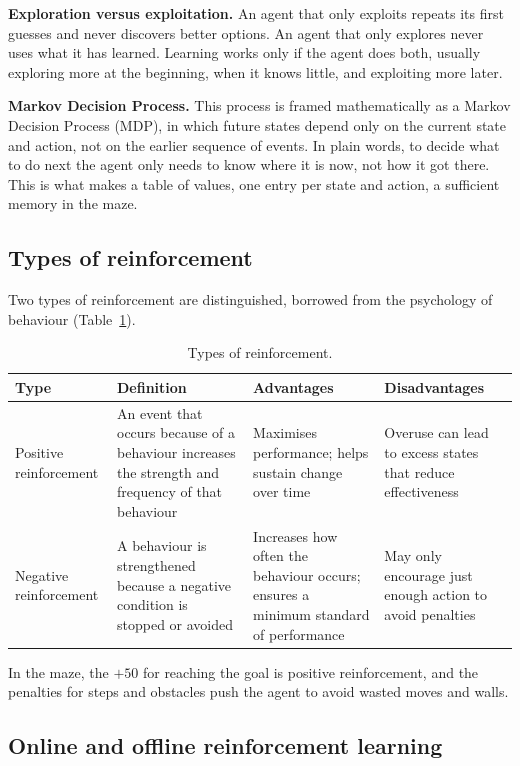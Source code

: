 \documentclass[11pt, a4paper]{article}
\begin{document}
\textbf{Exploration versus exploitation.} An agent that only exploits repeats its first guesses and never discovers better options. An agent that only explores never uses what it has learned. Learning works only if the agent does both, usually exploring more at the beginning, when it knows little, and exploiting more later.

\textbf{Markov Decision Process.} This process is framed mathematically as a Markov Decision Process (MDP), in which future states depend only on the current state and action, not on the earlier sequence of events. In plain words, to decide what to do next the agent only needs to know where it is now, not how it got there. This is what makes a table of values, one entry per state and action, a sufficient memory in the maze.

\subsection{Types of reinforcement}

Two types of reinforcement are distinguished, borrowed from the psychology of behaviour (Table~\ref{tab:reinforcement}).

\begin{table}[H]
\centering
\small
\caption{Types of reinforcement.}
\label{tab:reinforcement}
\begin{tabularx}{\textwidth}{l X X X}
\toprule
Type & Definition & Advantages & Disadvantages \\
\midrule
Positive reinforcement & An event that occurs because of a behaviour increases the strength and frequency of that behaviour & Maximises performance; helps sustain change over time & Overuse can lead to excess states that reduce effectiveness \\
Negative reinforcement & A behaviour is strengthened because a negative condition is stopped or avoided & Increases how often the behaviour occurs; ensures a minimum standard of performance & May only encourage just enough action to avoid penalties \\
\bottomrule
\end{tabularx}
\end{table}

In the maze, the $+50$ for reaching the goal is positive reinforcement, and the penalties for steps and obstacles push the agent to avoid wasted moves and walls.

\subsection{Online and offline reinforcement learning}
\end{document}
